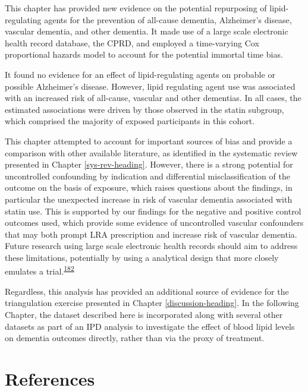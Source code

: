 \documentclass[a4paper, twoside]{templates/ociamthesis}
\begin{document}
This chapter has provided new evidence on the potential repurposing of lipid-regulating agents for the prevention of all-cause dementia, Alzheimer's disease, vascular dementia, and other dementia. It made use of a large scale electronic health record database, the CPRD, and employed a time-varying Cox proportional hazards model to account for the potential immortal time bias.

It found no evidence for an effect of lipid-regulating agents on probable or possible Alzheimer's disease. However, lipid regulating agent use was associated with an increased risk of all-cause, vascular and other dementias. In all cases, the estimated associations were driven by those observed in the statin subgroup, which comprised the majority of exposed participants in this cohort.

This chapter attempted to account for important sources of bias and provide a comparison with other available literature, as identified in the systematic review presented in Chapter \ref{sys-rev-heading}. However, there is a strong potential for uncontrolled confounding by indication and differential misclassification of the outcome on the basis of exposure, which raises questions about the findings, in particular the unexpected increase in risk of vascular dementia associated with statin use. This is supported by our findings for the negative and positive control outcomes used, which provide some evidence of uncontrolled vascular confounders that may both prompt LRA prescription and increase risk of vascular dementia. Future research using large scale electronic health records should aim to address these limitations, potentially by using a analytical design that more closely emulates a trial.\textsuperscript{\protect\hyperlink{ref-danaei2013b}{182}}

Regardless, this analysis has provided an additional source of evidence for the triangulation exercise presented in Chapter \ref{discussion-heading}. In the following Chapter, the dataset described here is incorporated along with several other datasets as part of an IPD analysis to investigate the effect of blood lipid levels on dementia outcomes directly, rather than via the proxy of treatment.

\newpage

\hypertarget{references-3}{%
\section{References}\label{references-3}}
\end{document}
